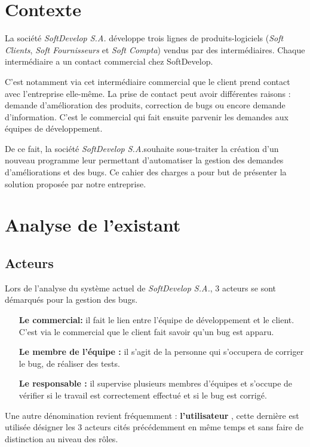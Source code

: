 \documentclass{article}[12pt]
\begin{document}

\tableofcontents%
\newpage


\section{Contexte}

La société \textit{SoftDevelop S.A.} développe trois lignes de produits-logiciels (\textit{Soft Clients}, \textit{Soft Fournisseurs}
et \textit{Soft Compta}) vendus par des intermédiaires. Chaque intermédiaire a un contact commercial chez
SoftDevelop. \\ \par
C'est notamment via cet intermédiaire commercial que le client prend contact avec l'entreprise elle-même.
La prise de contact peut avoir différentes raisons : demande d'amélioration des produits,
correction de bugs ou encore demande d'information. C'est le commercial qui fait ensuite parvenir les
demandes aux équipes de développement. \\ \par 
De ce fait, la société \textit{SoftDevelop S.A.}souhaite sous-traiter la création d'un nouveau programme leur
permettant d'automatiser la gestion des demandes d'améliorations et des bugs.
Ce cahier des charges a pour but de présenter la solution proposée par notre entreprise.

\section{Analyse de l'existant}

\subsection{Acteurs}
Lors de l'analyse du système actuel de \textit{SoftDevelop S.A.}, 3 acteurs se sont démarqués pour la gestion des bugs.
\begin{itemize}
	\item[\textbf{Le commercial:}] il fait le lien entre l'équipe de développement et le client. C'est via le commercial que le client fait savoir qu'un bug est apparu.
	\item[\textbf{Le membre de l'équipe :}]il s'agit de la personne qui s'occupera de corriger le bug, de réaliser des tests.
	\item[\textbf{Le responsable :}]il supervise plusieurs membres d'équipes et s'occupe de vérifier si le travail est correctement effectué et si le bug est corrigé.
\end{itemize}
Une autre dénomination revient fréquemment : \textbf{l'utilisateur} , cette dernière est utilisée désigner les 3 acteurs cités précédemment en même temps et sans faire de distinction au niveau des rôles.
\end{document}
